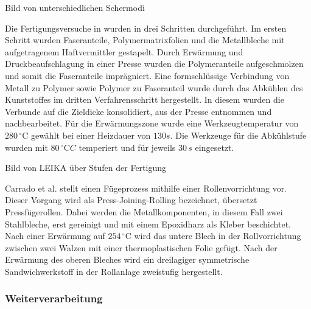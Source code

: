 Bild von unterschiedlichen Schermodi



Die Fertigungsversuche in \cite{LEIKA.2017} wurden in drei Schritten durchgeführt. Im ersten Schritt wurden Faseranteile, Polymermatrixfolien und die Metallbleche mit aufgetragenem Haftvermittler gestapelt.
Durch Erwärmung und Druckbeaufschlagung in einer Presse wurden die Polymeranteile aufgeschmolzen und somit die Faseranteile imprägniert. Eine formschlüssige Verbindung von Metall zu Polymer sowie Polymer zu Faseranteil wurde durch das Abkühlen des Kunststoffes im dritten Verfahrensschritt hergestellt. In diesem wurden die Verbunde auf die Zieldicke konsolidiert, aus der Presse entnommen und nachbearbeitet.
Für die Erwärmungszone wurde eine Werkzeugtemperatur von $280\, ^\circ \text{C}$ gewählt bei einer Heizdauer von $130 s$. Die Werkzeuge für die Abkühlstufe wurden mit $80\, ^\circ\text{C} C$ temperiert und für jeweils $30\, s$ eingesetzt. \cite{LEIKA.2017}

Bild von LEIKA über Stufen der Fertigung

Carrado et al. \cite{Carrado.2010} stellt einen Fügeprozess mithilfe einer Rollenvorrichtung vor. Dieser Vorgang wird als Press-Joining-Rolling bezeichnet, übersetzt Pressfügerollen. Dabei werden die Metallkomponenten, in diesem Fall zwei Stahlbleche, erst gereinigt und mit einem Epoxidharz als Kleber beschichtet. Nach einer Erwärmung auf $254 \, ^\circ \text{C}$ wird das untere Blech in der Rollvorrichtung zwischen zwei Walzen mit einer thermoplastischen Folie gefügt. Nach der Erwärmung des oberen Bleches wird ein dreilagiger symmetrische Sandwichwerkstoff in der Rollanlage zweistufig hergestellt.



\subsubsection{Weiterverarbeitung}

